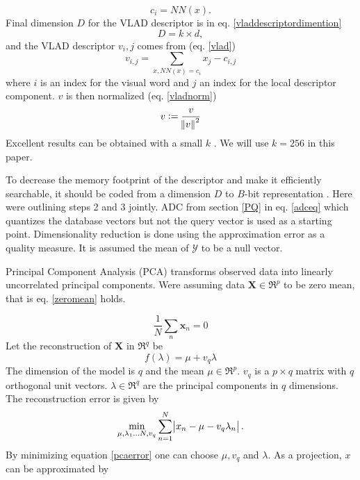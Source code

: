 \documentclass[english,12pt,a4paper,pdftex,elec,utf8, table]{aaltothesis}
\begin{document}
\begin{equation}
  \label{vladdescriptortovw}
c_i = NN(x).
\end{equation}
Final dimension $D$ for the VLAD descriptor is in eq. \ref{vladdescriptordimention}
\begin{equation}
  \label{vladdescriptordimention}
  D = k \times d,
\end{equation}
and the VLAD descriptor $v_i,j$ comes from (eq. \ref{vlad})
\begin{equation}
  \label{vlad}
  v_{i,j} = \sum_{x, NN(x)=c_i} x_j - c_{i,j}
\end{equation}
where $i$ is an index for the visual word and $j$ an index for the local descriptor component. $v$ is then normalized (eq. \ref{vladnorm})
\begin{equation}
  \label{vladnorm}
  v := \frac{v}{\norm{v}^2}
  \end{equation}
Excellent results can be obtained with a small $k$ \cite{Jegou2014}. We will use $k=256$ in this paper.

To decrease the memory footprint of the descriptor and make it efficiently searchable, it should be coded from a dimension $D$ to $B$-bit representation \cite{Jegou2014}. Here were outlining steps 2 and 3 jointly. ADC from section \ref{PQ} in eq. \ref{adceq} which quantizes the database vectors but not the query vector is used as a starting point. Dimensionality reduction is done using the approximation error as a quality measure. It is assumed the mean of $\mathcal{Y}$ to be a null vector.\cite{Jegou2014}

Principal Component Analysis (PCA) transforms observed data into linearly uncorrelated principal components. Were assuming data $\boldsymbol{X} \in \Re^{p}$ to be zero mean, that is eq. \ref{zeromean} holds.

\begin{equation}\label{zeromean}
\frac{1}{N}\sum_n \boldsymbol{x}_n = 0
\end{equation}
Let the reconstruction of $\boldsymbol{X}$ in $\Re^{q}$ be
\begin{equation} \label{pca}
f(\lambda) = \mu + v_q\lambda
\end{equation}
The dimension of the model is $q$ and the mean $\mu \in \Re^p$. $v_q$ is a $p \times q$ matrix with $q$ orthogonal unit vectors. $\lambda \in \Re^q$ are the principal components in $q$ dimensions. The reconstruction error is given by
\begin{equation}\label{pcaerror}
\min_{\mu,\lambda_1\ldots N, v_q}\sum_{n=1}^N \abs{x_n-\mu - v_q\lambda_n}.
\end{equation}
By minimizing equation \ref{pcaerror} one can choose $\mu, v_q$ and $\lambda$. \cite{Blei2008} As a projection, $x$ can be approximated by
\end{document}
